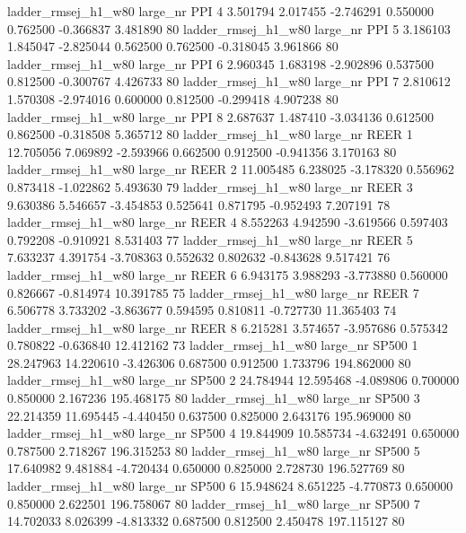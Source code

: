 ladder_rmsej_h1_w80   large_nr      PPI                 4  3.501794  2.017455  -2.746291 0.550000 0.762500 -0.366837    3.481890 80
ladder_rmsej_h1_w80   large_nr      PPI                 5  3.186103  1.845047  -2.825044 0.562500 0.762500 -0.318045    3.961866 80
ladder_rmsej_h1_w80   large_nr      PPI                 6  2.960345  1.683198  -2.902896 0.537500 0.812500 -0.300767    4.426733 80
ladder_rmsej_h1_w80   large_nr      PPI                 7  2.810612  1.570308  -2.974016 0.600000 0.812500 -0.299418    4.907238 80
ladder_rmsej_h1_w80   large_nr      PPI                 8  2.687637  1.487410  -3.034136 0.612500 0.862500 -0.318508    5.365712 80
ladder_rmsej_h1_w80   large_nr     REER                 1 12.705056  7.069892  -2.593966 0.662500 0.912500 -0.941356    3.170163 80
ladder_rmsej_h1_w80   large_nr     REER                 2 11.005485  6.238025  -3.178320 0.556962 0.873418 -1.022862    5.493630 79
ladder_rmsej_h1_w80   large_nr     REER                 3  9.630386  5.546657  -3.454853 0.525641 0.871795 -0.952493    7.207191 78
ladder_rmsej_h1_w80   large_nr     REER                 4  8.552263  4.942590  -3.619566 0.597403 0.792208 -0.910921    8.531403 77
ladder_rmsej_h1_w80   large_nr     REER                 5  7.633237  4.391754  -3.708363 0.552632 0.802632 -0.843628    9.517421 76
ladder_rmsej_h1_w80   large_nr     REER                 6  6.943175  3.988293  -3.773880 0.560000 0.826667 -0.814974   10.391785 75
ladder_rmsej_h1_w80   large_nr     REER                 7  6.506778  3.733202  -3.863677 0.594595 0.810811 -0.727730   11.365403 74
ladder_rmsej_h1_w80   large_nr     REER                 8  6.215281  3.574657  -3.957686 0.575342 0.780822 -0.636840   12.412162 73
ladder_rmsej_h1_w80   large_nr    SP500                 1 28.247963 14.220610  -3.426306 0.687500 0.912500  1.733796  194.862000 80
ladder_rmsej_h1_w80   large_nr    SP500                 2 24.784944 12.595468  -4.089806 0.700000 0.850000  2.167236  195.468175 80
ladder_rmsej_h1_w80   large_nr    SP500                 3 22.214359 11.695445  -4.440450 0.637500 0.825000  2.643176  195.969000 80
ladder_rmsej_h1_w80   large_nr    SP500                 4 19.844909 10.585734  -4.632491 0.650000 0.787500  2.718267  196.315253 80
ladder_rmsej_h1_w80   large_nr    SP500                 5 17.640982  9.481884  -4.720434 0.650000 0.825000  2.728730  196.527769 80
ladder_rmsej_h1_w80   large_nr    SP500                 6 15.948624  8.651225  -4.770873 0.650000 0.850000  2.622501  196.758067 80
ladder_rmsej_h1_w80   large_nr    SP500                 7 14.702033  8.026399  -4.813332 0.687500 0.812500  2.450478  197.115127 80
